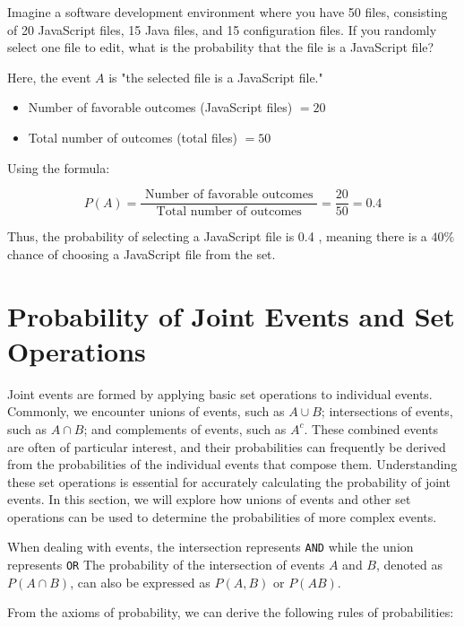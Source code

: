 \begin{example}
    Imagine a software development environment where you have 50 files, consisting of 20 JavaScript files, 15 Java files, and 15 configuration files. If you randomly select one file to edit, what is the probability that the file is a JavaScript file?
\end{example}

\begin{solution}
Here, the event $A$ is "the selected file is a JavaScript file."
\begin{itemize}
    \item Number of favorable outcomes (JavaScript files) $=20$
    \item Total number of outcomes (total files) $=50$
\end{itemize}

Using the formula:

$$
P(A)=\frac{\text { Number of favorable outcomes }}{\text { Total number of outcomes }}=\frac{20}{50}=0.4
$$

Thus, the probability of selecting a JavaScript file is 0.4 , meaning there is a $40 \%$ chance of choosing a JavaScript file from the set.
\leavevmode\end{solution}

\section{Probability of Joint Events and Set Operations}
Joint events are formed by applying basic set operations to individual events. Commonly, we encounter unions of events, such as $A \cup B$; intersections of events, such as $A \cap B$; and complements of events, such as $A^c$. These combined events are often of particular interest, and their probabilities can frequently be derived from the probabilities of the individual events that compose them. Understanding these set operations is essential for accurately calculating the probability of joint events. In this section, we will explore how unions of events and other set operations can be used to determine the probabilities of more complex events.

When dealing with events, the intersection represents \texttt{AND} while the union represents \texttt{OR} The probability of the intersection of events $A$ and $B$, denoted as $P(A \cap B)$, can also be expressed as $P(A, B)$ or $P(A B)$.

From the axioms of probability, we can derive the following rules of probabilities:

